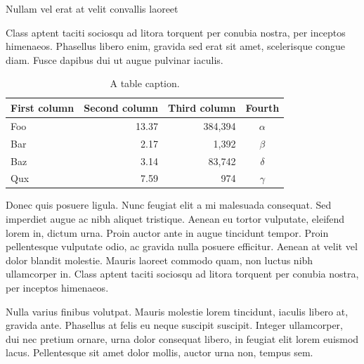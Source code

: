 \documentclass[final]{beamer}
\newlength{\colwidth}
\begin{document}
\begin{frame}[t]
\begin{columns}[t]
\begin{column}{\colwidth}
                \begin{block}{Nullam vel erat at velit convallis laoreet}

                    Class aptent taciti sociosqu ad litora torquent per conubia nostra, per
                    inceptos himenaeos. Phasellus libero enim, gravida sed erat sit amet,
                    scelerisque congue diam. Fusce dapibus dui ut augue pulvinar iaculis.

                    \begin{table}
                        \centering
                        \begin{tabular}{l r r c}
                            \toprule
                            \textbf{First column} & \textbf{Second column} & \textbf{Third column} & \textbf{Fourth} \\
                            \midrule
                            Foo & 13.37 & 384,394 & $\alpha$ \\
                            Bar & 2.17 & 1,392 & $\beta$ \\
                            Baz & 3.14 & 83,742 & $\delta$ \\
                            Qux & 7.59 & 974 & $\gamma$ \\
                            \bottomrule
                        \end{tabular}
                        \caption{A table caption.}
                    \end{table}

                    Donec quis posuere ligula. Nunc feugiat elit a mi malesuada consequat. Sed
                    imperdiet augue ac nibh aliquet tristique. Aenean eu tortor vulputate,
                    eleifend lorem in, dictum urna. Proin auctor ante in augue tincidunt
                    tempor. Proin pellentesque vulputate odio, ac gravida nulla posuere
                    efficitur. Aenean at velit vel dolor blandit molestie. Mauris laoreet
                    commodo quam, non luctus nibh ullamcorper in. Class aptent taciti sociosqu
                    ad litora torquent per conubia nostra, per inceptos himenaeos.

                    Nulla varius finibus volutpat. Mauris molestie lorem tincidunt, iaculis
                    libero at, gravida ante. Phasellus at felis eu neque suscipit suscipit.
                    Integer ullamcorper, dui nec pretium ornare, urna dolor consequat libero,
                    in feugiat elit lorem euismod lacus. Pellentesque sit amet dolor mollis,
                    auctor urna non, tempus sem.


\end{block}
\end{column}
\end{columns}
\end{frame}
\end{document}
